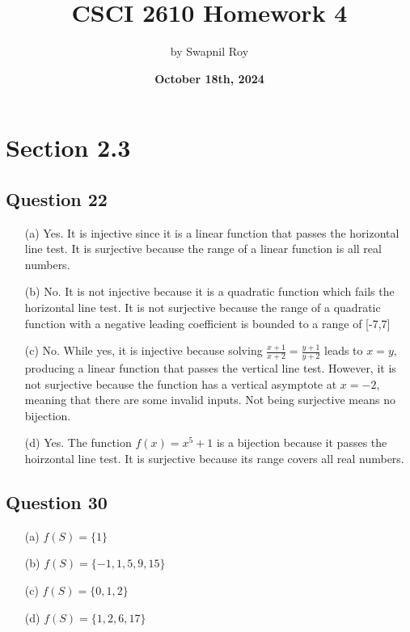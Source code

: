 \documentclass{article}
\title{\textbf{CSCI 2610 Homework 4}}
\date{\textbf{October 18th, 2024}}
\author{by Swapnil Roy}
\begin{document}
\maketitle
\raggedright

\section*{Section 2.3}

\subsection*{Question 22}
\begin{itemize}
    \item[(a)] Yes. It is injective since it is a linear function that passes the horizontal line test.  It is surjective because the range of a linear function is all real numbers.
    
    \item[(b)] No. It is not injective because it is a quadratic function which fails the horizontal line test. It is not surjective because the range of a quadratic function with a negative leading coefficient is bounded to a range of [-7,7]
    
    \item[(c)] No. While yes, it is injective because solving \( \frac{x+1}{x+2} = \frac{y+1}{y+2} \) leads to \( x = y \), producing a linear function that passes the vertical line test. However, 
    it is not surjective because the function has a vertical asymptote at \( x = -2 \), meaning that there are some invalid inputs. Not being surjective means no bijection.

    \item[(d)] Yes. The function \( f(x) = x^5 + 1 \) is a bijection because it passes the hoirzontal line test. It is surjective because its range covers all real numbers.
\end{itemize}



\subsection*{Question 30}
\begin{itemize}
    \item[(a)] \( f(S) = \{1\} \)
    \item[(b)] \( f(S) = \{-1, 1, 5, 9, 15\} \)
    \item[(c)] \( f(S) = \{0, 1, 2\} \)
    \item[(d)] \( f(S) = \{1, 2, 6, 17\} \)
\end{itemize}
\end{document}
